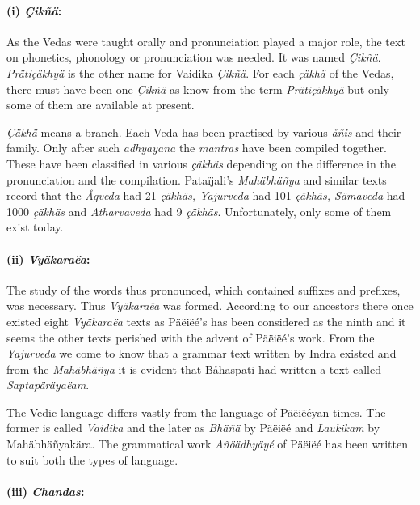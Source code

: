 \paragraph*{(i) \textit{ Çikñä}:}

As the Vedas were taught orally and pronunciation played a major role, the text on phonetics, phonology or pronunciation was needed. It was named \textit{Çikñä}. \textit{Prätiçäkhyä} is the other name for Vaidika \textit{Çikñä}. For each \textit{çäkhä} of the Vedas, there must have been one \textit{Çikñä} as know from the term \textit{Prätiçäkhyä} but only some of them are available at present.

\textit{Çäkhä} means a branch. Each Veda has been practised by various \textit{åñis} and their family. Only after such \textit{adhyayana} the \textit{mantras} have been compiled together. These have been classified in various \textit{çäkhäs} depending on the difference in the pronunciation and the compilation. Pataïjali’s \textit{Mahäbhäñya} and similar texts record that the \textit{Ågveda} had 21 \textit{çäkhäs, Yajurveda} had 101 \textit{çäkhäs, Sämaveda} had 1000 \textit{çäkhäs} and \textit{Atharvaveda} had 9 \textit{çäkhäs}. Unfortunately, only some of them exist today.


\paragraph*{(ii) \textit{Vyäkaraëa}:}

The study of the words thus pronounced, which contained suffixes and prefixes, was necessary. Thus \textit{Vyäkaraëa} was formed. According to our ancestors there once existed eight \textit{Vyäkaraëa} texts as Päëiëé’s has been considered as the ninth and it seems the other texts perished with the advent of Päëiëé’s work. From the \textit{Yajurveda} we come to know that a grammar text written by Indra existed and from the \textit{Mahäbhäñya} it is evident that Båhaspati had written a text called \textit{Saptapäräyaëam}.

The Vedic language differs vastly from the language of Päëiëéyan times. The former is called \textit{Vaidika} and the later as \textit{Bhäñä} by Päëiëé and \textit{Laukikam} by Mahäbhäñyakära. The grammatical work \textit{Añöädhyäyé} of Päëiëé has been written to suit both the types of language.


\paragraph*{(iii) \textit{Chandas}:}

